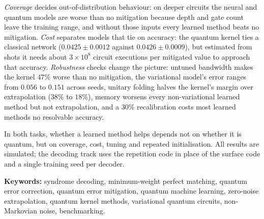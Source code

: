 \emph{Coverage} decides out-of-distribution behaviour: on deeper circuits the neural
and quantum models are worse than no mitigation because depth and gate count leave
the training range, and without those inputs every learned method beats no
mitigation. \emph{Cost} separates models that tie on accuracy: the quantum kernel
ties a classical network ($0.0425 \pm 0.0012$ against $0.0426 \pm 0.0009$), but
estimated from shots it needs about $3 \times 10^8$ circuit executions per mitigated
value to approach that accuracy. \emph{Robustness} checks change the picture:
untuned bandwidth makes the kernel $47\%$ worse than no mitigation, the variational
model's error ranges from $0.056$ to $0.151$ across seeds, unitary folding halves the
kernel's margin over extrapolation ($38\%$ to $18\%$), memory worsens every
non-variational learned method but not extrapolation, and a $30\%$ recalibration
costs most learned methods no resolvable accuracy.

In both tasks, whether a learned method helps depends not on whether it is quantum,
but on coverage, cost, tuning and repeated initialisation. All results are simulated;
the decoding track uses the repetition code in place of the surface code and a single
training seed per decoder.

\vspace{0.4cm}
\noindent\textbf{Keywords:} syndrome decoding, minimum-weight perfect matching,
quantum error correction, quantum error mitigation, quantum machine learning,
zero-noise extrapolation, quantum kernel methods, variational quantum circuits,
non-Markovian noise, benchmarking.
